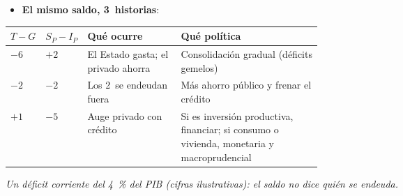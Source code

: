 \documentclass{article}
\begin{document}
\begin{columnas}
\noindent\begin{minipage}{\linewidth}
\begin{itemize}[itemsep=1.5pt]
\item \textbf{El mismo saldo, 3~historias}:
\end{itemize}
{\footnotesize\setlength{\tabcolsep}{2.5pt}\renewcommand{\arraystretch}{1.1}
\begin{tabularx}{\linewidth}{>{\centering\arraybackslash}p{0.11\linewidth}>{\centering\arraybackslash}p{0.11\linewidth}>{\raggedright\arraybackslash}p{0.3\linewidth}>{\raggedright\arraybackslash}X}
\toprule
\rowcolor{tceemoradopalido}$T-G$ & $S_P-I_P$ & \textbf{Qué ocurre} & \textbf{Qué política}\\
\midrule
\cellcolor{tceesalmon}$-6$ & \cellcolor{tceesalvia}$+2$ & El Estado gasta; el privado ahorra & Consolidación gradual (déficits gemelos)\\
\cellcolor{tceesalmon}$-2$ & \cellcolor{tceesalmon}$-2$ & Los 2~se endeudan fuera & Más ahorro público y frenar el crédito\\
\cellcolor{tceesalvia}$+1$ & \cellcolor{tceesalmon}$-5$ & Auge privado con crédito & Si es inversión productiva, financiar; si consumo o vivienda, monetaria y macroprudencial\\
\bottomrule
\end{tabularx}}
{\scriptsize\itshape\color{tceegris} Un déficit corriente del 4~\% del PIB (cifras ilustrativas): el saldo no dice quién se endeuda.\par}
\end{minipage}


\end{columnas}
\end{document}
